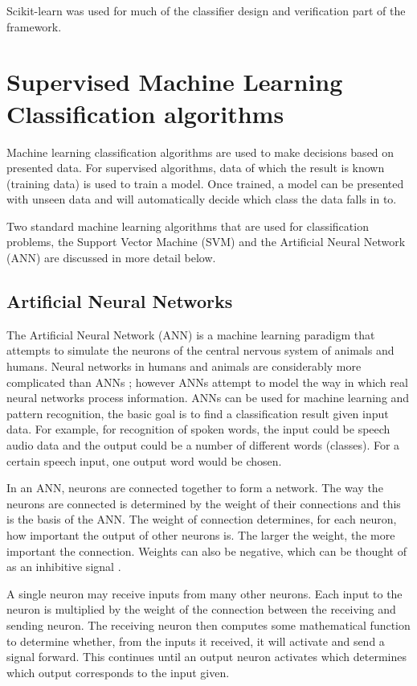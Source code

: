 Scikit-learn was used for much of the classifier design and verification part of the framework.

\section{Supervised Machine Learning Classification algorithms}

Machine learning classification algorithms are used to make decisions based on presented data. For supervised algorithms, data of which the result is known (training data) is used to train a model. Once trained, a model can be presented with unseen data and will automatically decide which class the data falls in to. 

Two standard machine learning algorithms that are used for classification problems, the Support Vector Machine (SVM) and the Artificial Neural Network (ANN) are discussed in more detail below. 

\subsection{Artificial Neural Networks}
\label{ANNAppendix}

The Artificial Neural Network (ANN) is a machine learning paradigm that attempts to simulate the neurons of the central nervous system of animals and humans. Neural networks in humans and animals are considerably more complicated than ANNs \cite{Graupe2013}; however ANNs attempt to model the way in which real neural networks process information. ANNs can be used for machine learning and pattern recognition, the basic goal is to find a classification result given input data. For example, for recognition of spoken words, the input could be speech audio data and the output could be a number of different words (classes). For a certain speech input, one output word would be chosen. 

In an ANN, neurons are connected together to form a network. The way the neurons are connected is determined by the weight of their connections and this is the basis of the ANN. The weight of connection determines, for each neuron, how important the output of other neurons is. The larger the weight, the more important the connection. Weights can also be negative, which can be thought of as an inhibitive signal \cite{Graupe2013}.

A single neuron may receive inputs from many other neurons. Each input to the neuron is multiplied by the weight of the connection between the receiving and sending neuron. The receiving neuron then computes some mathematical function to determine whether, from the inputs it received, it will activate and send a signal forward. This continues until an output neuron activates which determines which output corresponds to the input given. 

